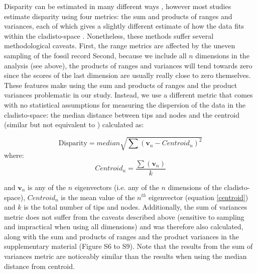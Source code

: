 \documentclass[12pt,letterpaper]{article}
\begin{document}

Disparity can be estimated in many different ways \citep[e.g.][]{Wills1994,Ciampaglio2004,thorneresetting2011,hopkinsdecoupling2013,huang2015origins}, however most studies estimate disparity using four metrics: the sum and products of ranges and variances, each of which gives a slightly different estimate of how the data fits within the cladisto-space \citep{Foote01071994,Wills1994,brusatte50,Brusatte12092008,cisneros2010,thorneresetting2011,prentice2011,brusattedinosaur2012,toljagictriassic-jurassic2013,ruta2013,bentonmodels2014,bensonfaunal2014}.
Nonetheless, these methods suffer several methodological caveats.
First, the range metrics are affected by the uneven sampling of the fossil record \citep{Butler2012}
Second, because we include all $n$ dimensions in the analysis (see above), the products of ranges and variances will tend towards zero since the scores of the last dimension are usually really close to zero themselves. 
These features make using the sum and products of ranges and the product variances problematic in our study.
Instead, we use a different metric that comes with no statistical assumptions for measuring the dispersion of the data in the cladisto-space: the median distance between tips and nodes and the centroid (similar but not equivalent to \citealt{Wills1994,kornextinction2013,huang2015origins}) calculated as:

\begin{equation}
   \text{Disparity}=median{\displaystyle\sqrt{\sum{(\mathbf{v}_{n}-Centroid_{n})^2}}}
    \label{disparity}
\end{equation}
where:
\begin{equation}
    Centroid_{n}=\frac{\displaystyle\sum(\mathbf{v}_{n})}{k} 
    \label{centroid}
\end{equation}

\noindent
and $\mathbf{v}_{n}$ is any of the $n$ eigenvectors (i.e. any of the $n$ dimensions of the cladisto-space), $Centroid_{n}$ is the mean value of the $n^{th}$ eigenvector (equation \ref{centroid}) and $k$ is the total number of tips and nodes.
Additionally, the sum of variances metric does not suffer from the caveats described above (sensitive to sampling and impractical when using all dimensions) and was therefore also calculated, along with the sum and products of ranges and the product variances in the supplementary material (Figure S6 to S9).
Note that the results from the sum of variances metric are noticeably similar than the results when using the median distance from centroid. 
\end{document}
